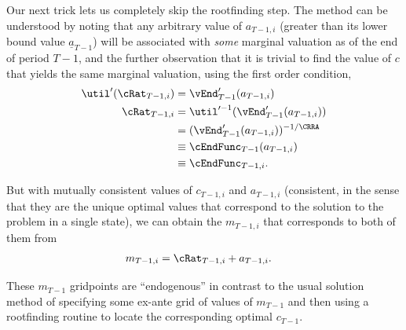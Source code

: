 \documentclass[titlepage]{\econtex}
\begin{document}
Our next trick lets us completely skip the rootfinding step.  The method can be understood by noting that
any arbitrary value of ${a}_{T-1,i}$ (greater than its lower bound
value $\underline{a}_{T-1}$) will be associated with \textit{some}
marginal valuation as of the end of period $T-1$, and the further
observation that it is trivial to find the value of ${c}$ that yields
the same marginal valuation, using the first order condition,
\begin{equation}\begin{gathered}\begin{aligned}
  \util^{\prime}({\cRat}_{T-1,i})  & = 
                                          \vEnd^{\prime}_{T-1}({a}_{T-1,i}) \label{eq:eulerTm1}
  \\ {\cRat}_{T-1,i}  & = \util^{\prime-1}(\vEnd^{\prime}_{T-1}({a}_{T-1,i}))
  \\  & = (\vEnd^{\prime}_{T-1}({a}_{T-1,i}))^{-1/\CRRA}
  \\  & \equiv  \cEndFunc_{T-1}({a}_{T-1,i})
  \\  & \equiv  \cEndFunc_{T-1,i}
                .
\end{aligned}\end{gathered}\end{equation}

But with mutually consistent values of ${c}_{T-1,i}$ and ${a}_{T-1,i}$ (consistent, in the sense that they are the unique optimal
values that correspond to the solution to the problem in a single state), we can
obtain the ${m}_{T-1,i}$ that corresponds to both of them from
\begin{equation}\begin{gathered}\begin{aligned}
  {m}_{T-1,i}  & = {\cRat}_{T-1,i}+{a}_{T-1,i}.
\end{aligned}\end{gathered}\end{equation}

These ${m}_{T-1}$ gridpoints are ``endogenous'' in contrast to the usual solution method of
specifying some ex-ante grid of values of ${m}_{T-1}$ and then using a rootfinding
routine to locate the corresponding optimal ${c}_{T-1}$.
\end{document}

